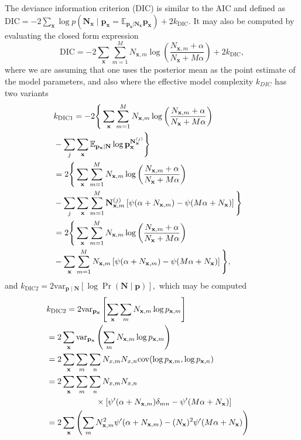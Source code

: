 \documentclass[prl,twocolumn,groupedaddress]{revtex4-1}
\newcommand{\bN}{\mathbf{N}}
\newcommand{\bx}{\mathbf{x}}
\newcommand{\bp}{\mathbf{p}}
\newcommand{\var}{\mathrm{var}}
\newcommand{\cov}{\mathrm{cov}}
\begin{document}
 The deviance information criterion (DIC) is similar to the AIC and defined as 
$\textrm{DIC} = -2\sum_{\bx}\log p\left(\bN_{\bx} \mid \bp_{\bx} = \mathbb{E}_{\bp_{\bx}\vert \bN_\bx}  \bp_{\bx}   \right) + 2k_{\textrm{DIC}}.$ It may also be computed by evaluating the closed form expression
\begin{equation}
\textrm{DIC} =-2\sum_{\bx}\sum_{m=1}^M N_{\bx,m}\log \left( \frac{N_{\bx,m} +\alpha}{N_\bx+ M\alpha}  \right)+  2k_{\textrm{DIC}},
\end{equation}
where we are assuming that one uses the posterior mean as the point estimate of the model parameters, and also where the effective model complexity $k_{DIC}$ has two variants
 \begin{align}
\lefteqn{ k_{\textrm{DIC1}}= -2\Bigg\{ \sum_{\bx}\sum_{m=1}^M N_{\bx,m}\log \left( \frac{N_{\bx,m} +\alpha}{N_\bx+ M\alpha}  \right)   } \nonumber\\
 & -\sum_j \sum_\bx \mathbb{E}_{\bp_\bx\vert\bN}\log\bp_\bx^{\bN_{\bx}^{(j)}} \Bigg\} \nonumber\\
 &=2\Bigg\{ \sum_{\bx}\sum_{m=1}^M N_{\bx,m}\log \left( \frac{N_{\bx,m} +\alpha}{N_\bx+ M\alpha}  \right)   \nonumber\\
 & -\sum_j \sum_\bx \sum_{m=1}^M {\bN_{\bx,m}^{(j)}}  \left[ \psi(\alpha+N_{\bx,m}) - \psi(M\alpha+N_{\bx}) \right] \Bigg\} \nonumber\\
  &=2\Bigg\{ \sum_{\bx}\sum_{m=1}^M N_{\bx,m}\log \left( \frac{N_{\bx,m} +\alpha}{N_\bx+ M\alpha}  \right)   \nonumber\\
 & - \sum_\bx \sum_{m=1}^M {N_{\bx,m} }  \left[ \psi(\alpha+N_{\bx,m}) - \psi(M\alpha+N_{\bx}) \right] \Bigg\} ,\nonumber\\
  \end{align}
  and $k_{\textrm{DIC2}} = 2\textrm{var}_{\bp\mid\bN}\left[ \log \Pr\left( \bN\mid \bp\right) \right] ,$ which may be computed
 \begin{align}
\lefteqn{k_{\textrm{DIC2}} =2 \var_{\bp_\bx}\left[ \sum_{\bx}\sum_{m} N_{\bx,m} \log p_{\bx,m}  \right] }\nonumber \\
&=2\sum_{\bx} \var_{\bp_\bx}\left( \sum_{m} N_{\bx,m} \log p_{\bx,m} \right) \nonumber\\
&=2\sum_{\bx} \sum_{m}\sum_{n} N_{x,m}N_{x,n} \cov(\log p_{\bx,m},\log p_{\bx,n}) \nonumber\\
&=2\sum_{\bx} \sum_m\sum_n N_{x,m}N_{x,n} \nonumber\\
&\qquad\qquad\qquad\times\left[ \psi^\prime(\alpha+N_{\bx,m})\delta_{mn} - \psi^\prime(M\alpha+N_{\bx})  \right] \nonumber\\
&=2\sum_{\bx} \left(\sum_m N_{\bx,m}^2 \psi^\prime(\alpha+N_{\bx,m})  - (N_{\bx})^2  \psi^\prime(M\alpha+N_{\bx}) \right)
\end{align}
\end{document}
